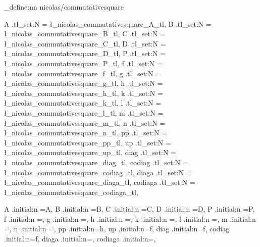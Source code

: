 \keys_define:nn {nicolas/commutativesquare}
{	
	A     .tl_set:N = \l_nicolas_commutativesquare_A_tl,
	B   .tl_set:N = \l_nicolas_commutativesquare_B_tl,
	C .tl_set:N = \l_nicolas_commutativesquare_C_tl,
	D .tl_set:N = \l_nicolas_commutativesquare_D_tl,
	P .tl_set:N = \l_nicolas_commutativesquare_P_tl,
	f      .tl_set:N = \l_nicolas_commutativesquare_f_tl,
	g   .tl_set:N = \l_nicolas_commutativesquare_g_tl,
	h   .tl_set:N = \l_nicolas_commutativesquare_h_tl,
	k .tl_set:N = \l_nicolas_commutativesquare_k_tl,
	l .tl_set:N = \l_nicolas_commutativesquare_l_tl,
	m .tl_set:N = \l_nicolas_commutativesquare_m_tl,
	n .tl_set:N = \l_nicolas_commutativesquare_n_tl,
	pp .tl_set:N = \l_nicolas_commutativesquare_pp_tl,
	up .tl_set:N = \l_nicolas_commutativesquare_up_tl,
	diag .tl_set:N = \l_nicolas_commutativesquare_diag_tl,	
	codiag .tl_set:N = \l_nicolas_commutativesquare_codiag_tl,		
	diaga .tl_set:N = \l_nicolas_commutativesquare_diaga_tl,	
	codiaga .tl_set:N = \l_nicolas_commutativesquare_codiaga_tl,		
	
	A		.initial:n =A,
	B		.initial:n =B,
	C		.initial:n =C,
	D		.initial:n =D,
	P		.initial:n =P,
	f    .initial:n =,
	g    .initial:n =,
	h    .initial:n =,
	k    .initial:n =,
	l    .initial:n =,
	m    .initial:n =,
	n	 .initial:n =,
	pp .initial:n=h,	
	up .initial:n=f,
	diag .initial:n=f,
	codiag .initial:n=f,
	diaga .initial:n=,
	codiaga .initial:n=,
}

